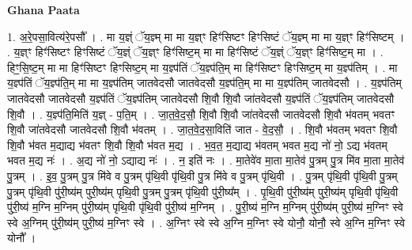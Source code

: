 \documentclass[17pt]{extarticle}
\begin{document}
\textbf{Ghana Paata } \newline

1. अ॒रे॒पसा॒वित्य॑रे॒पसौ᳚ । . मा य॒ज्ञ्ं ॅय॒ज्ञ्म् मा मा य॒ज्ञ्ꣳ हिꣳ॑सिष्टꣳ हिꣳसिष्टं ॅय॒ज्ञ्म् मा मा य॒ज्ञ्ꣳ हिꣳ॑सिष्टम् । . य॒ज्ञ्ꣳ हिꣳ॑सिष्टꣳ हिꣳसिष्टं ॅय॒ज्ञ्ं ॅय॒ज्ञ्ꣳ हिꣳ॑सिष्ट॒म् मा मा हिꣳ॑सिष्टं ॅय॒ज्ञ्ं ॅय॒ज्ञ्ꣳ हिꣳ॑सिष्ट॒म् मा । . हिꣳ॒॒सि॒ष्ट॒म् मा मा हिꣳ॑सिष्टꣳ हिꣳसिष्ट॒म् मा य॒ज्ञ्प॑तिं ॅय॒ज्ञ्प॑ति॒म् मा हिꣳ॑सिष्टꣳ हिꣳसिष्ट॒म् मा य॒ज्ञ्प॑तिम् । . मा य॒ज्ञ्प॑तिं ॅय॒ज्ञ्प॑ति॒म् मा मा य॒ज्ञ्प॑तिम् जातवेदसौ जातवेदसौ य॒ज्ञ्प॑ति॒म् मा मा य॒ज्ञ्प॑तिम् जातवेदसौ । . य॒ज्ञ्प॑तिम् जातवेदसौ जातवेदसौ य॒ज्ञ्प॑तिं ॅय॒ज्ञ्प॑तिम् जातवेदसौ शि॒वौ शि॒वौ जा॑तवेदसौ य॒ज्ञ्प॑तिं ॅय॒ज्ञ्प॑तिम् जातवेदसौ शि॒वौ । . य॒ज्ञ्प॑ति॒मिति॑ य॒ज्ञ् - प॒ति॒म् । . जा॒त॒वे॒द॒सौ॒ शि॒वौ शि॒वौ जा॑तवेदसौ जातवेदसौ शि॒वौ भ॑वतम् भवतꣳ शि॒वौ जा॑तवेदसौ जातवेदसौ शि॒वौ भ॑वतम् । . जा॒त॒वे॒द॒सा॒विति॑ जात - वे॒द॒सौ॒ । . शि॒वौ भ॑वतम् भवतꣳ शि॒वौ शि॒वौ भ॑वत म॒द्याद्य भ॑वतꣳ शि॒वौ शि॒वौ भ॑वत म॒द्य । . भ॒व॒त॒ म॒द्याद्य भ॑वतम् भवत म॒द्य नो॑ नो॒ ऽद्य भ॑वतम् भवत म॒द्य नः॑ । . अ॒द्य नो॑ नो॒ ऽद्याद्य नः॑ । . न॒ इति॑ नः । . मा॒तेवे॑व मा॒ता मा॒तेव॑ पु॒त्रम् पु॒त्र मि॑व मा॒ता मा॒तेव॑ पु॒त्रम् । . इ॒व॒ पु॒त्रम् पु॒त्र मि॑वे व पु॒त्रम् पृ॑थि॒वी पृ॑थि॒वी पु॒त्र मि॑वे व पु॒त्रम् पृ॑थि॒वी । . पु॒त्रम् पृ॑थि॒वी पृ॑थि॒वी पु॒त्रम् पु॒त्रम् पृ॑थि॒वी पु॑री॒ष्य॑म् पुरी॒ष्य॑म् पृथि॒वी पु॒त्रम् पु॒त्रम् पृ॑थि॒वी पु॑री॒ष्य᳚म् । . पृ॒थि॒वी पु॑री॒ष्य॑म् पुरी॒ष्य॑म् पृथि॒वी पृ॑थि॒वी पु॑री॒ष्य॑ म॒ग्नि म॒ग्निम् पु॑री॒ष्य॑म् पृथि॒वी पृ॑थि॒वी पु॑री॒ष्य॑ म॒ग्निम् । . पु॒री॒ष्य॑ म॒ग्नि म॒ग्निम् पु॑री॒ष्य॑म् पुरी॒ष्य॑ म॒ग्निꣳ स्वे स्वे अ॒ग्निम् पु॑री॒ष्य॑म् पुरी॒ष्य॑ म॒ग्निꣳ स्वे । . अ॒ग्निꣳ स्वे स्वे अ॒ग्नि म॒ग्निꣳ स्वे योनौ॒ योनौ॒ स्वे अ॒ग्नि म॒ग्निꣳ स्वे योनौ᳚ । \newline
\end{document}

